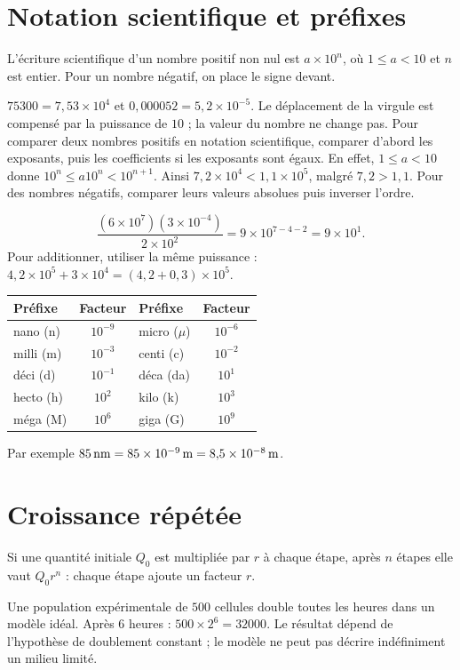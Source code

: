 \documentclass[../cours_3e.tex]{subfiles}
\begin{document}
\section{Notation scientifique et préfixes}
\begin{definition}
L'écriture scientifique d'un nombre positif non nul est $a\times10^n$, où $1\leq a<10$ et $n$ est entier. Pour un nombre négatif, on place le signe devant.
\end{definition}
$75300=7{,}53\times10^4$ et $0{,}000052=5{,}2\times10^{-5}$. Le déplacement de la virgule est compensé par la puissance de $10$ ; la valeur du nombre ne change pas.
Pour comparer deux nombres positifs en notation scientifique, comparer d'abord les exposants, puis les coefficients si les exposants sont égaux. En effet, $1\leq a<10$ donne $10^n\leq a10^n<10^{n+1}$. Ainsi $7{,}2\times10^4<1{,}1\times10^5$, malgré $7{,}2>1{,}1$. Pour des nombres négatifs, comparer leurs valeurs absolues puis inverser l'ordre.
\begin{exemple}
\[
\frac{(6\times10^7)(3\times10^{-4})}{2\times10^2}
=9\times10^{7-4-2}=9\times10^1.
\]
Pour additionner, utiliser la même puissance : $4{,}2\times10^5+3\times10^4=(4{,}2+0{,}3)\times10^5$.
\end{exemple}
\begin{center}
\begin{tabular}{lclc}
\toprule Préfixe & Facteur & Préfixe & Facteur\\\midrule
nano (n)&$10^{-9}$& micro ($\mu$)&$10^{-6}$\\
milli (m)&$10^{-3}$& centi (c)&$10^{-2}$\\
déci (d)&$10^{-1}$& déca (da)&$10^1$\\
hecto (h)&$10^2$& kilo (k)&$10^3$\\
méga (M)&$10^6$& giga (G)&$10^9$\\\bottomrule
\end{tabular}
\end{center}
Par exemple $85\,\mathrm{nm}=85\times10^{-9}\,\mathrm{m}=8{,}5\times10^{-8}\,\mathrm{m}$.
\section{Croissance répétée}
Si une quantité initiale $Q_0$ est multipliée par $r$ à chaque étape, après $n$ étapes elle vaut $Q_0r^n$ : chaque étape ajoute un facteur $r$.
\begin{exemple}
Une population expérimentale de $500$ cellules double toutes les heures dans un modèle idéal. Après $6$ heures : $500\times2^6=32000$. Le résultat dépend de l'hypothèse de doublement constant ; le modèle ne peut pas décrire indéfiniment un milieu limité.
\end{exemple}
\end{document}
